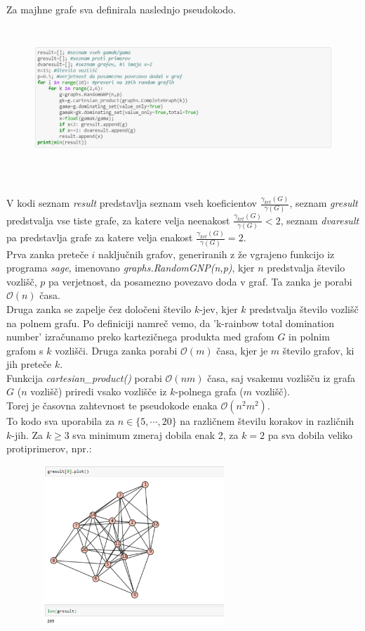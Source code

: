 \documentclass[a4paper]{article}
\begin{document}
Za majhne grafe sva definirala naslednjo pseudokodo.
\begin{figure}[h!]
    \centering
    \includegraphics[width=13cm, height=5.35cm]{Slika1}
    \label{fig:mesh1}
\end{figure}\\
V kodi seznam \textit{result} predstavlja seznam vseh koeficientov $\frac{\gamma_{krt}(G)}{\gamma(G)}$, seznam \textit{gresult} predstvalja vse tiste grafe, za katere velja neenakost $\frac{\gamma_{krt}(G)}{\gamma(G)} < 2$, seznam \textit{dvaresult} pa predstavlja grafe za katere velja enakost $\frac{\gamma_{krt}(G)}{\gamma(G)} = 2$.\\
Prva zanka preteče $i$ naključnih grafov, generiranih z že vgrajeno funkcijo iz programa \textit{sage}, imenovano \textit{graphs.RandomGNP(n,p)}, kjer $n$ predstvalja število vozlišč, $p$ pa verjetnost, da posamezno povezavo doda v graf. Ta zanka je porabi $\mathcal{O}(n)$ časa.\\
Druga zanka se zapelje čez določeni število $k$-jev, kjer $k$ predstvalja število vozlišč na polnem grafu. Po definiciji namreč  vemo, da 'k-rainbow total domination number' izračunamo preko kartezičnega produkta med grafom $G$ in polnim grafom s $k$ vozlišči. Druga zanka porabi $\mathcal{O}(m)$ časa, kjer je $m$ število grafov, ki jih preteče $k$.\\
Funkcija \textit{cartesian\_product()} porabi $\mathcal{O}(n m)$ časa, saj vsakemu vozlišču iz grafa $G$ ($n$ vozlišč) priredi vsako vozlišče iz $k$-polnega grafa ($m$ vozlišč).\\
Torej je časovna zahtevnost te pseudokode enaka $\mathcal{O}(n^2 m^2)$.\\[1.5mm]
To kodo sva uporabila za $n \in \{5, \cdots, 20\}$ na različnem številu korakov in različnih $k$-jih. Za $k \geq 3$ sva minimum zmeraj dobila enak 2, za $k = 2$ pa sva dobila veliko protiprimerov, npr.:
\pagebreak
\begin{figure}[h!]
    \centering
    \includegraphics[width=7.5cm, height=6cm]{Slika2}
    \label{fig:mesh1}
\end{figure}\\
\end{document}
